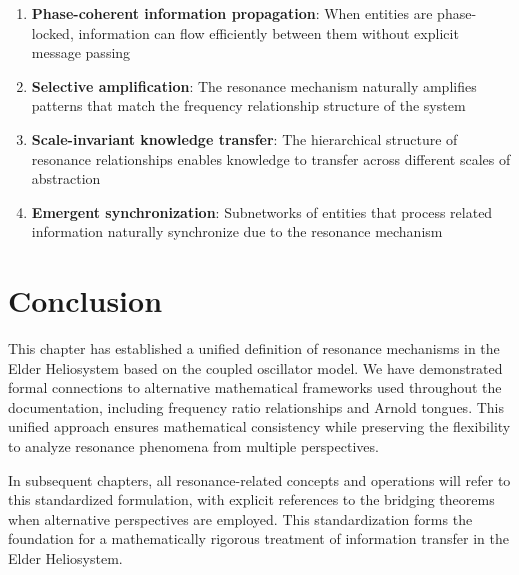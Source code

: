 \begin{enumerate}
    \item \textbf{Phase-coherent information propagation}: When entities are phase-locked, information can flow efficiently between them without explicit message passing
    
    \item \textbf{Selective amplification}: The resonance mechanism naturally amplifies patterns that match the frequency relationship structure of the system
    
    \item \textbf{Scale-invariant knowledge transfer}: The hierarchical structure of resonance relationships enables knowledge to transfer across different scales of abstraction
    
    \item \textbf{Emergent synchronization}: Subnetworks of entities that process related information naturally synchronize due to the resonance mechanism
\end{enumerate}

\section{Conclusion}

This chapter has established a unified definition of resonance mechanisms in the Elder Heliosystem based on the coupled oscillator model. We have demonstrated formal connections to alternative mathematical frameworks used throughout the documentation, including frequency ratio relationships and Arnold tongues. This unified approach ensures mathematical consistency while preserving the flexibility to analyze resonance phenomena from multiple perspectives.

In subsequent chapters, all resonance-related concepts and operations will refer to this standardized formulation, with explicit references to the bridging theorems when alternative perspectives are employed. This standardization forms the foundation for a mathematically rigorous treatment of information transfer in the Elder Heliosystem.